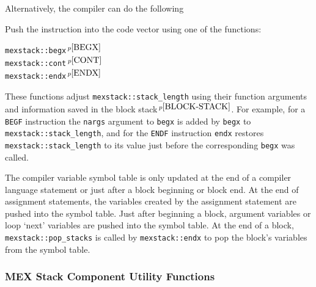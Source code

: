 \documentclass[12pt]{article}
\newcommand{\pagnote}[1]{$\,^{p\pageref{#1}}$}
\newenvironment{indpar}[1][0.3in]%
	{\begin{list}{}%
		     {\setlength{\itemsep}{0in}%
		      \setlength{\topsep}{0in}%
		      \setlength{\parsep}{1ex}%
		      \setlength{\labelwidth}{#1}%
		      \setlength{\leftmargin}{#1}%
		      \addtolength{\leftmargin}{\labelsep}}%
	 \item}%
	{\end{list}}
\begin{document}
Alternatively, the compiler can do the following

\begin{enumerate}
\item Push the instruction into the code vector using one of the
functions:
\begin{indpar}[1in]
{\tt mexstack::begx}\pagnote{BEGX} \\
{\tt mexstack::cont}\pagnote{CONT} \\
{\tt mexstack::endx}\pagnote{ENDX}
\end{indpar}
\item These functions adjust {\tt mexstack::stack\_length} using
their function arguments and information saved in the
block stack\pagnote{BLOCK-STACK}.  For example, for a {\tt BEGF}
instruction the {\tt nargs} argument to {\tt begx} is added by
{\tt begx} to {\tt mexstack::stack\_length}, and for the {\tt ENDF}
instruction {\tt endx} restores {\tt mexstack::stack\_length}
to its value just before the corresponding {\tt begx} was called.

\end{enumerate}

The compiler variable symbol table is only updated at the end of
a compiler language statement or just after a block beginning or block end.
At the end of assignment
statements, the variables created by the assignment statement are
pushed into the symbol table.  Just after beginning a block,
argument variables or loop `next' variables are pushed into the symbol table.
At the end of a block,
{\tt mexstack::pop\_stacks} is called by {\tt mexstack::endx}
to pop the block's variables from the symbol table.

\subsubsection{MEX Stack Component Utility Functions}
\label{MEX-STACK-COMPONENT-UTILITY-FUNCTIONS}
\end{document}
